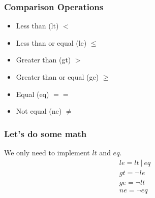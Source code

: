 \begin{frame}
    \frametitle{Comparison Operations}
    \begin{itemize}
        \item Less than (lt) $<$
        \item Less than or equal (le) $\leq$
        \item Greater than (gt) $>$
        \item Greater than or equal (ge) $\geq$
        \item Equal (eq) $==$
        \item Not equal (ne) $\neq$
    \end{itemize}
    \note{
    }
\end{frame}

\begin{frame}
    \frametitle{Let's do some math}
    We only need to implement $lt$ and $eq$.
    \begin{equation}
        \begin{aligned}
            &le = lt\ |\ eq\\
            &gt = \neg le\\
            &ge = \neg lt\\
            &ne = \neg eq
        \end{aligned}
    \end{equation}
    \note{
    }
\end{frame}
